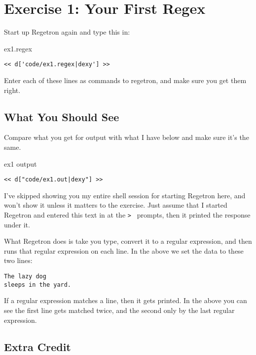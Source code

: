 \chapter{Exercise 1: Your First Regex}

Start up Regetron again and type this in:

\begin{code}{ex1.regex}
\begin{Verbatim}
<< d['code/ex1.regex|dexy'] >>
\end{Verbatim}
\end{code}

Enter each of these lines as commands to regetron, and make sure you get
them right.

\section{What You Should See}

Compare what you get for output with what I have below and
make sure it's the same.

\begin{code}{ex1 output}
\begin{Verbatim}
<< d["code/ex1.out|dexy"] >>
\end{Verbatim}
\end{code}

I've skipped showing you my entire shell session for starting
Regetron here, and won't show it unless it matters to the exercise.
Just assume that I started Regetron and entered this text in at the
\verb|> | prompts, then it printed the response under it.

What Regetron does is take you type, convert it to a regular expression,
and then runs that regular expression on each line.  In the above
we set the data to these two lines:

\begin{Verbatim}
The lazy dog
sleeps in the yard.
\end{Verbatim}

If a regular expression matches a line, then it gets printed.  In the
above you can see the first line gets matched twice, and the second
only by the last regular expression.

\section{Extra Credit}

